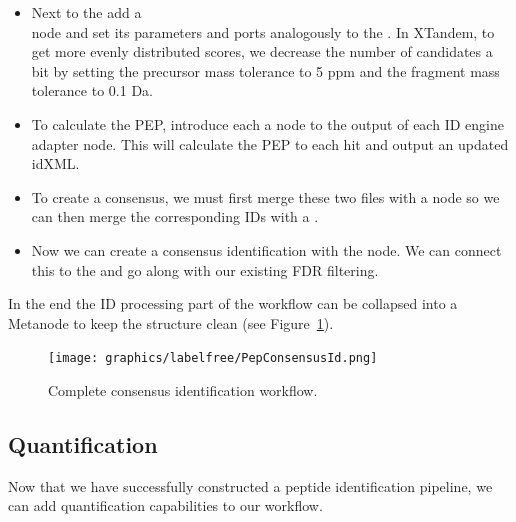 \begin{itemize}
\item
Next to the  add a  \\
 node and set its parameters and ports analogously to the . In XTandem, to get more evenly distributed scores, we decrease the number of candidates a bit by setting the precursor mass tolerance to 5 ppm and the fragment mass tolerance to 0.1 Da.
\item
To calculate the PEP, introduce each a   node to the output of each ID engine adapter node.
This will calculate the PEP to each hit and output an updated idXML.
\item
To create a consensus, we must first merge these two files with a  node  so we can then merge the corresponding IDs with a  .
\item
Now we can create a consensus identification with the   node.
We can connect this to the  and go along with our existing FDR filtering.
\end{itemize}

\noindent In the end the ID processing part of the workflow can be collapsed into a Metanode to keep the structure clean (see Figure~\ref{fig:consensusid}).

\begin{figure}[htbp]
  \centering
  \texttt{[image: graphics/labelfree/PepConsensusId.png]}
  \caption{Complete consensus identification workflow.}
  \label{fig:consensusid}
\end{figure}

\newpage
\subsection{Quantification}
\label{Labelfree_Quantification}

Now that we have successfully constructed a peptide identification pipeline, we can add quantification capabilities to our workflow.

